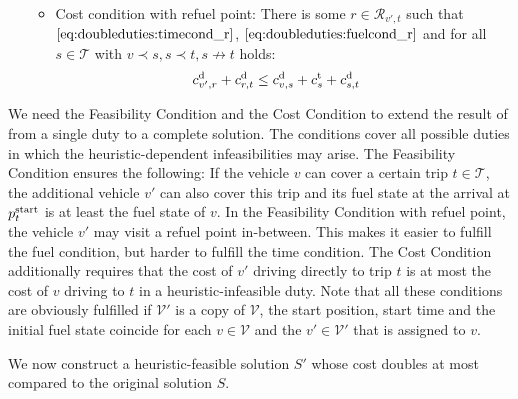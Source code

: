 \begin{definition}[Conditions]
\begin{enumerate}
\begin{itemize}
\begin{align}
			\end{align}
		\item Cost condition with refuel point: There is some ${r\in\mathcal{R}_{v',t}}$ such that $\eqref{eq:doubleduties:timecond_r}$, $\eqref{eq:doubleduties:fuelcond_r}$ and for all $s\in\mathcal{T}$ with ${v\prec s, s\prec t, s\not\to t}$ holds:
			\begin{align}
				c^{\operatorname{d}}_{v',r} + c^{\operatorname{d}}_{r,t} & \leq c^{\operatorname{d}}_{v,s} + c^{\operatorname{t}}_s + c^{\operatorname{d}}_{s,t} \label{eq:doubleduties:costcond_r}
			\end{align}
	\end{itemize}
\end{enumerate}

\end{definition}

We need the Feasibility Condition and the Cost Condition to extend the result of  from a single duty to a complete solution. The conditions cover all possible duties in which the heuristic-dependent infeasibilities may arise. The Feasibility Condition ensures the following: If the vehicle $v$ can cover a certain trip ${t\in\mathcal{T}}$, the additional vehicle $v'$ can also cover this trip and its fuel state at the arrival at $p^{\operatorname{start}}_t$ is at least the fuel state of $v$. In the Feasibility Condition with refuel point, the vehicle $v'$ may visit a refuel point in-between. This makes it easier to fulfill the fuel condition, but harder to fulfill the time condition. The Cost Condition additionally requires that the cost of $v'$ driving directly to trip $t$ is at most the cost of $v$ driving to $t$ in a heuristic-infeasible duty. Note that all these conditions are obviously fulfilled if $\mathcal{V}'$ is a copy of $\mathcal{V}$, \ie the start position, start time and the initial fuel state coincide for each ${v\in\mathcal{V}}$ and the ${v'\in\mathcal{V'}}$ that is assigned to $v$.

We now construct a heuristic-feasible solution $S'$ whose cost doubles at most compared to the original solution $S$.

